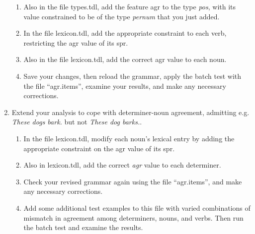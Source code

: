 \documentclass[10pt]{article}
\begin{document}
\begin{enumerate}
\begin{enumerate}
\item Also in the file types.tdl, add the feature {\sc agr} to the type 
{\it pos}, with its value constrained to be of the type {\it pernum} that you 
just added. 
\item In the file lexicon.tdl, add the appropriate constraint to each verb,
restricting the {\sc agr} value of its {\sc spr}.
\item Also in the file lexicon.tdl, add the correct {\sc agr} value to each
noun.
\item Save your changes, then reload the grammar, apply the batch test with
the file ``agr.items'', examine your results, and make any necessary 
corrections.
\end{enumerate}

\item Extend your analysis to cope with determiner-noun agreement, admitting
e.g. {\it These dogs bark.} but not {\it These dog barks.}.

\begin{enumerate}
\item In the file lexicon.tdl, modify each noun's lexical entry by adding
the appropriate constraint on the {\sc agr} value of its {\sc spr}.
\item Also in lexicon.tdl, add the correct {\it agr} value to each determiner.
\item Check your revised grammar again using the file ``agr.items'', and make
any necessary corrections.  
\item Add some additional test examples to this file with varied combinations
of mismatch in agreement among determiners, nouns, and verbs.  Then run the
batch test and examine the results.
\end{enumerate}

\vspace{.5in}


\end{enumerate}
\end{document}
